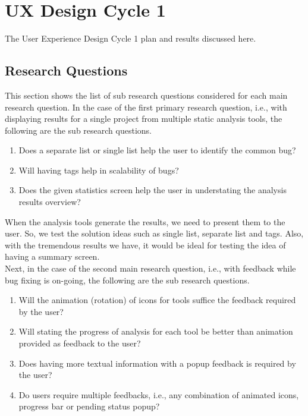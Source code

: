 \chapter{UX Design Cycle 1}
\label{ch:ux1-cycle_report}

The User Experience Design Cycle 1 plan and results discussed here.

\section{Research Questions}

This section shows the list of sub research questions considered for each main research question. In the case of the first primary research question, i.e., with displaying results for a single project from multiple static analysis tools, the following are the sub research questions. \\

\begin{enumerate}
\item Does a separate list or single list help the user to identify the common bug?
\item Will having tags help in scalability of bugs?
\item Does the given statistics screen help the user in understating the analysis results overview? \\
\end{enumerate}

When the analysis tools generate the results, we need to present them to the user. So, we test the solution ideas such as single list, separate list and tags. Also, with the tremendous results we have, it would be ideal for testing the idea of having a summary screen. \\

Next, in the case of the second main research question, i.e., with feedback while bug fixing is on-going, the following are the sub research questions. \\

\begin{enumerate}
\item Will the animation (rotation) of icons for tools suffice the feedback required by the user?
\item Will stating the progress of analysis for each tool be better than animation provided as feedback to the user?
\item Does having more textual information with a popup feedback is required by the user?
\item Do users require multiple feedbacks, i.e., any combination of animated icons, progress bar or pending status popup? \\
\end{enumerate}

